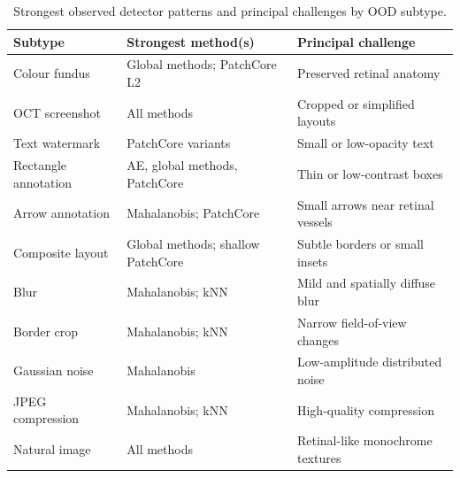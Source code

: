 \documentclass[fleqn,12pt]{olplainarticle}
\begin{document}
\begin{table}[htbp]
    \centering
    \caption[Subtype-level detector patterns and challenges.]
    {Strongest observed detector patterns and principal challenges by OOD
    subtype.}
    \label{tab:subtype_method_interpretation}

    \footnotesize
    \setlength{\tabcolsep}{4pt}
    \renewcommand{\arraystretch}{1.05}

    \begin{tabularx}{0.92\textwidth}{@{}
        >{\raggedright\arraybackslash}p{3.0cm}
        >{\raggedright\arraybackslash}p{4.15cm}
        >{\raggedright\arraybackslash}X
    @{}}
        \toprule
        \textbf{Subtype} &
        \textbf{Strongest method(s)} &
        \textbf{Principal challenge} \\
        \midrule

        Colour fundus &
        Global methods; PatchCore L2 &
        Preserved retinal anatomy \\

        OCT screenshot &
        All methods &
        Cropped or simplified layouts \\

        \addlinespace[0.12em]

        Text watermark &
        PatchCore variants &
        Small or low-opacity text \\

        Rectangle annotation &
        AE, global methods, PatchCore &
        Thin or low-contrast boxes \\

        Arrow annotation &
        Mahalanobis; PatchCore &
        Small arrows near retinal vessels \\

        Composite layout &
        Global methods; shallow PatchCore &
        Subtle borders or small insets \\

        Blur &
        Mahalanobis; kNN &
        Mild and spatially diffuse blur \\

        Border crop &
        Mahalanobis; kNN &
        Narrow field-of-view changes \\

        Gaussian noise &
        Mahalanobis &
        Low-amplitude distributed noise \\

        JPEG compression &
        Mahalanobis; kNN &
        High-quality compression \\

        \addlinespace[0.12em]

        Natural image &
        All methods &
        Retinal-like monochrome textures \\

        \bottomrule
    \end{tabularx}
\end{table}
\end{document}
